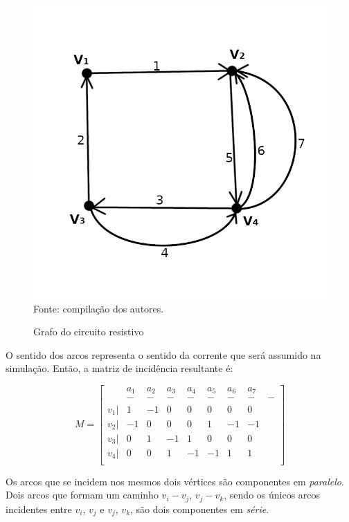 \documentclass[twocolumn, 10pt]{extarticle}
\begin{document}
\begin{figure}[H]
	\caption{Grafo do circuito resistivo} 
	\centering
	\includegraphics[scale=1]{grcrc1}
	\\ Fonte: compilação dos autores.
\end{figure}

O sentido dos arcos representa o sentido da corrente que será assumido na simulação. Então, a matriz de incidência resultante é:

\[
M = 
\begin{bmatrix}
 & a_1 & a_2 & a_3 & a_4 & a_5 & a_6 & a_7 \\
 & - & - & - & - & - & - & - & - \\
 v_1 |& 1  & -1 & 0  & 0  & 0  & 0  & 0  \\
 v_2 |& -1 & 0  & 0  & 0  & 1  & -1 & -1 \\
 v_3 |& 0  & 1  & -1 & 1  & 0  & 0  & 0  \\
 v_4 |& 0  & 0  & 1  & -1 & -1 & 1  & 1  \\
\end{bmatrix}
\]

Os arcos que se incidem nos mesmos dois vértices são componentes em \textit{paralelo}. Dois arcos que formam um caminho $v_i - v_j$, $v_j - v_k$, sendo os únicos arcos incidentes entre $v_i$, $v_j$ e $v_j$, $v_k$, são dois componentes em \textit{série}.
\end{document}
